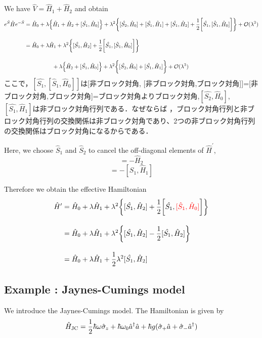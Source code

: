We have $\hat{V}=\hat{H}_1 + \hat{H}_2$ and obtain 
\begin{align}
    e^{\hat{S}}\hat{H}e^{-\hat{S}}
    &=\hat{H}_0 + \lambda
    \Bigl\{\hat{H}_1+\hat{H}_2+[\hat{S_1}, \hat{H}_0]\Bigr\}
    +\lambda^2
    \biggl\{[\hat{S_2}, \hat{H}_0]
    +[\hat{S_1}, \hat{H}_1]
    +[\hat{S_1}, \hat{H}_2]
    +\frac{1}{2}\biggl[
    \hat{S_1}, [\hat{S}_{1}, \hat{H}_0]
    \biggr]
    \biggr\}
    +\mathcal{O}(\lambda^3)\nn[10pt]
    &=\hat{H}_0 + \lambda\hat{H}_1
    +\lambda^2
    \biggl\{
    [\hat{S_1}, \hat{H}_2]
    +\frac{1}{2}\biggl[
    \hat{S_1}, [\hat{S}_{1}, \hat{H}_0]
    \biggr]
    \biggr\}\nn[10pt]
    &\hspace{50pt}+\lambda
    \Bigl\{\hat{H}_2+[\hat{S_1}, \hat{H}_0]\Bigr\}
    +\lambda^2
    \biggl\{[\hat{S_2}, \hat{H}_0]
    +[\hat{S_1}, \hat{H}_1]
    \biggr\}
    +\mathcal{O}(\lambda^3)
\end{align}
ここで，$[\hat{S_1}, [\hat{S}_{1}, \hat{H}_0]]$は[非ブロック対角, [非ブロック対角,ブロック対角]]=[非ブロック対角,ブロック対角]=ブロック対角よりブロック対角,$[\hat{S_2}, \hat{H}_0]$, $[\hat{S_1}, \hat{H}_1]$は非ブロック対角行列である．なぜならば
，ブロック対角行列と非ブロック対角行列の交換関係は非ブロック対角であり、2つの非ブロック対角行列の交換関係はブロック対角になるからである．

Here, we choose $\hat{S}_1$ and $\hat{S}_2$ to cancel the off-diagonal elements of $\hat{H}^{\prime}$, 
\begin{equation}
    [\hat{S_1}, \hat{H}_0]=-\hat{H}_2
\end{equation}
\begin{equation}
    [\hat{S_2}, \hat{H}_0]
    =-[\hat{S_1}, \hat{H}_1]
\end{equation}

Therefore we obtain the effective Hamiltonian
\begin{align}
    \hat{H}^{\prime}
    &=\hat{H}_0 + \lambda\hat{H}_1
    +\lambda^2
    \biggl\{
    [\hat{S_1}, \hat{H}_2]
    +\frac{1}{2}\biggl[
    \hat{S_1}, \textcolor{red}{[\hat{S}_{1}, \hat{H}_0]}
    \biggr]
    \biggr\}\\[10pt]
    &=\hat{H}_0 + \lambda\hat{H}_1
    +\lambda^2
    \biggl\{
    [\hat{S_1}, \hat{H}_2]
    -\frac{1}{2}[
    \hat{S_1}, \hat{H}_2
    ]
    \biggr\}\nn[10pt]
    &=\hat{H}_0 + \lambda\hat{H}_1
    +\frac{1}{2}\lambda^2
    [\hat{S_1}, \hat{H}_2]
\end{align}

\subsection{Example : Jaynes-Cumings model}
We introduce the Jaynes-Cumings model.
The Hamiltonian is given by
\begin{equation}
    \hat{H}_{\rm{JC}}
    =\frac{1}{2}\hbar\omega{\hat{\sigma}}_z
    +\hbar\omega_0\hat{a}^\dagger{\hat{a}}
    +\hbar g({\hat{\sigma}}_+\hat{a}+{\hat{\sigma}}_-\hat{a}^\dagger)
\end{equation}

